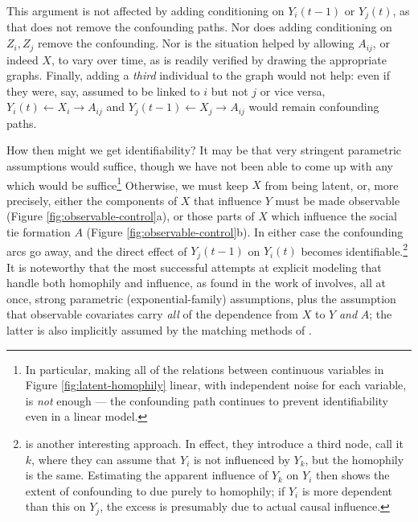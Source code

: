 \documentclass{article}
\begin{document}
\begin{multicols}{2}
This argument is not affected by adding conditioning on $Y_i(t-1)$ or $Y_j(t)$,
as that does not remove the confounding paths.  Nor does adding conditioning on
$Z_i, Z_j$ remove the confounding.  Nor is the situation helped by allowing
$A_{ij}$, or indeed $X$, to vary over time, as is readily verified by drawing
the appropriate graphs.  Finally, adding a {\em third} individual to the graph
would not help: even if they were, say, assumed to be linked to $i$ but not $j$
or vice versa, $Y_i(t) \leftarrow X_i \rightarrow A_{ij}$ and $Y_j(t-1)
\leftarrow X_j \rightarrow A_{ij}$ would remain confounding paths.

How then might we get identifiability?  It may be that very stringent
parametric assumptions would suffice, though we have not been able to come up
with any which would be suffice\footnote{In particular, making all of the
  relations between continuous variables in Figure \ref{fig:latent-homophily}
  linear, with independent noise for each variable, is {\em not} enough --- the
  confounding path continues to prevent identifiability even in a linear
  model.}  Otherwise, we must keep $X$ from being latent, or, more precisely,
either the components of $X$ that influence $Y$ must be made observable (Figure
\ref{fig:observable-control}a), or those parts of $X$ which influence the
social tie formation $A$ (Figure \ref{fig:observable-control}b).  In either case
the confounding arcs go away, and the direct effect of $Y_j(t-1)$ on $Y_i(t)$
becomes identifiable.\footnote{\citet{Elwert-Christakis-wives-and-ex-wives} is
  another interesting approach.  In effect, they introduce a third node, call
  it $k$, where they can assume that $Y_i$ is not influenced by $Y_k$, but the
  homophily is the same.  Estimating the apparent influence of $Y_k$ on $Y_i$
  then shows the extent of confounding to due purely to homophily; if $Y_i$ is
  more dependent than this on $Y_j$, the excess is presumably due to actual
  causal influence.}  It is noteworthy that the most successful attempts at
explicit modeling that handle both homophily and influence, as found in the
work of \citet{Leenders-structure-and-influence,
  Steglich-Snijders-Pearson-selection-and-influence} involves, all at once,
strong parametric (exponential-family) assumptions, plus the assumption that
observable covariates carry {\em all} of the dependence from $X$ to $Y$ {\em
  and} $A$; the latter is also implicitly assumed by the matching methods of
\citet{aral2009distinguishing}.



\end{multicols}
\end{document}
